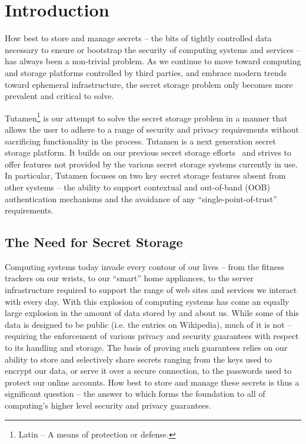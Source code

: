 \section{Introduction}
\label{sec:intro}

How best to store and manage secrets -- the bits of tightly controlled
data necessary to ensure or bootstrap the security of computing
systems and services -- has always been a non-trivial problem. As we
continue to move toward computing and storage platforms controlled by
third parties, and embrace modern trends toward ephemeral
infrastructure, the secret storage problem only becomes more prevalent
and critical to solve.

Tutamen\footnote{Latin -- A means of protection or defense.} is our
attempt to solve the secret storage problem in a manner that allows
the user to adhere to a range of security and privacy requirements
without sacrificing functionality in the process. Tutamen is a next
generation secret storage platform. It builds on our previous secret
storage efforts~\cite{custos-trios} and strives to offer features not
provided by the various secret storage systems currently in use. In
particular, Tutamen focuses on two key secret storage features absent
from other systems -- the ability to support contextual and
out-of-band (OOB) authentication mechanisms and the avoidance of any
``single-point-of-trust'' requirements.

\subsection{The Need for Secret Storage}

Computing systems today invade every contour of our lives -- from the 
fitness trackers on our wrists, to our ``smart'' home appliances, to 
the server infrastructure required to support the range of web sites 
and services we interact with every day. With this explosion of 
computing systems has come an equally large explosion in the amount of 
data stored by and about us. While some of this data is designed to be 
public (i.e. the entries on Wikipedia), much of it is not -- requiring 
the enforcement of various privacy and security guarantees with 
respect to its handling and storage. The basis of proving such 
guarantees relies on our ability to store and selectively share 
secrets ranging from the keys used to encrypt our data, or serve it 
over a secure connection, to the passwords used to protect our online 
accounts. How best to store and manage these secrets is thus a
significant question -- the answer to which forms the foundation to
all of computing's higher level security and privacy guarantees.

